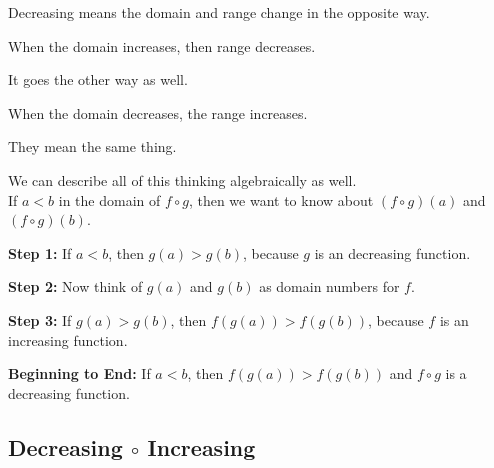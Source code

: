 \documentclass{ximera}
\begin{document}
\begin{warning}

Decreasing means the domain and range change in the opposite way.

When the domain increases, then range decreases.

It goes the other way as well.

When the domain decreases, the range increases.

They mean the same thing.


\end{warning}






We can describe all of this thinking algebraically as well. \\


If $a < b$ in the domain of $f \circ g$, then we want to know about $(f \circ g)(a)$  and $(f \circ g)(b)$.



\textbf{Step 1:}  If $a < b$, then $g(a) > g(b)$, because $g$ is an decreasing function.


\textbf{Step 2:}  Now think of $g(a)$  and $g(b)$ as domain numbers for $f$.


\textbf{Step 3:}  If $g(a) > g(b)$, then $f(g(a)) > f(g(b))$, because $f$ is an increasing function.


\textbf{Beginning to End:} If $a < b$, then $f(g(a)) > f(g(b))$ and $f \circ g$ is a decreasing function.






































\subsection*{Decreasing $\circ$ Increasing}
\end{document}
